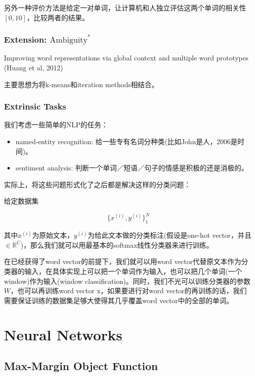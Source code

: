 \documentclass{article}
\begin{document}
另外一种评价方法是给定一对单词，让计算机和人独立评估这两个单词的相关性$[0,10]$，比较两者的结果。

\subsubsection*{Extension: $\text{Ambiguity}^*$}

Improving word representations via global context and multiple word prototypes (Huang et al, 2012)

主要思想为将k-means和iteration methods相结合。

\subsubsection*{Extrinsic Tasks}

我们考虑一些简单的NLP的任务：

\begin{itemize}
	\item named-entity recognition: 给一些专有名词分种类(比如John是人，2006是时间)。
	\item sentiment analysis: 判断一个单词／短语／句子的情感是积极的还是消极的。
\end{itemize}

实际上，将这些问题形式化了之后都是解决这样的分类问题：

给定数据集

$$\{x^{(i)},y^{(i)}\}_1^N$$

其中$x^{(i)}$为原始文本，$y^{(i)}$为给此文本做的分类标注(假设是one-hot vector，并且$\in \mathbb{R}^C$)，那么我们就可以用最基本的softmax线性分类器来进行训练。

在已经获得了word vector的前提下，我们就可以用word vector代替原文本作为分类器的输入，在具体实现上可以把一个单词作为输入，也可以把几个单词(一个window)作为输入(window classification)。同时，我们不光可以训练分类器的参数$W$，也可以再训练word vector $\mathrm{x}$，如果要进行对word vector的再训练的话，我们需要保证训练的数据集足够大使得其几乎覆盖word vector中的全部的单词。


\section{Neural Networks}

\subsection{Max-Margin Object Function}
\end{document}
